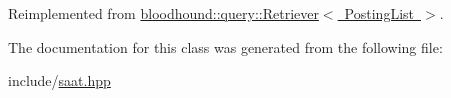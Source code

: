 Reimplemented from \mbox{\hyperlink{classbloodhound_1_1query_1_1Retriever_a58da32a5139b980ba874f8b5e6bb89ec}{bloodhound\+::query\+::\+Retriever$<$ Posting\+List $>$}}.



The documentation for this class was generated from the following file\+:\begin{DoxyCompactItemize}
\item 
include/\mbox{\hyperlink{saat_8hpp}{saat.\+hpp}}\end{DoxyCompactItemize}
